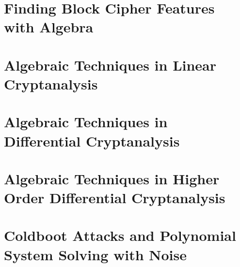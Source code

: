 \documentclass[a4paper,11pt]{report}
\theoremstyle{definition}
\begin{document}
\chapter{Finding Block Cipher Features with Algebra}
\label{chapter:algebraic_features}


\chapter{Algebraic Techniques in Linear Cryptanalysis}
\label{chapter:algebraic_linear_cryptanalysis}


\chapter{Algebraic Techniques in Differential Cryptanalysis}
\label{chapter:algebraic_differential_cryptanalysis}


\chapter{Algebraic Techniques in Higher Order Differential Cryptanalysis}
\label{chapter:algebraic_integral_cryptanalysis}


\chapter{Coldboot Attacks and Polynomial System Solving with Noise}
\label{chapter:coldboot}




\end{document}
